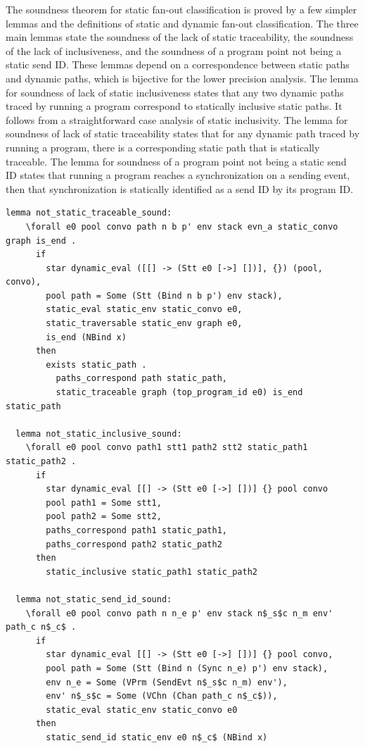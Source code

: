 \documentclass[10pt]{article}
\begin{document}
The soundness theorem for static fan-out classification is proved
by a few simpler lemmas and the
definitions of static and dynamic fan-out classification.  The three main lemmas state the
soundness of the lack of static traceability, the soundness of the lack of inclusiveness, and
the soundness of a program point not being a static send ID. These lemmas depend on a
correspondence between static paths and dynamic paths, which is bijective for the lower
precision analysis. The lemma for soundness of lack of static inclusiveness states that any two
dynamic paths traced by running a program correspond to statically inclusive static paths. It
follows from a straightforward case analysis of static inclusivity. The lemma for soundness of
lack of static traceability states that for any dynamic path traced by running a program, there
is a corresponding static path that is statically traceable. The lemma for soundness of a
program point not being a static send ID states that running a program reaches a
synchronization on a sending event, then that synchronization is statically identified as a
send ID by its program ID.

\begin{lstlisting}[language=logic, mathescape]
  lemma not_static_traceable_sound:
    \forall e0 pool convo path n b p' env stack evn_a static_convo graph is_end .
      if
        star dynamic_eval ([[] -> (Stt e0 [->] [])], {}) (pool, convo), 
        pool path = Some (Stt (Bind n b p') env stack),
        static_eval static_env static_convo e0,
        static_traversable static_env graph e0,
        is_end (NBind x)
      then
        exists static_path . 
          paths_correspond path static_path, 
          static_traceable graph (top_program_id e0) is_end static_path

  lemma not_static_inclusive_sound:
    \forall e0 pool convo path1 stt1 path2 stt2 static_path1 static_path2 . 
      if
        star dynamic_eval [[] -> (Stt e0 [->] [])] {} pool convo
        pool path1 = Some stt1, 
        pool path2 = Some stt2, 
        paths_correspond path1 static_path1, 
        paths_correspond path2 static_path2
      then
        static_inclusive static_path1 static_path2

  lemma not_static_send_id_sound:
    \forall e0 pool convo path n n_e p' env stack n$_s$c n_m env' path_c n$_c$ .
      if
        star dynamic_eval [[] -> (Stt e0 [->] [])] {} pool convo, 
        pool path = Some (Stt (Bind n (Sync n_e) p') env stack), 
        env n_e = Some (VPrm (SendEvt n$_s$c n_m) env'), 
        env' n$_s$c = Some (VChn (Chan path_c n$_c$)), 
        static_eval static_env static_convo e0
      then 
        static_send_id static_env e0 n$_c$ (NBind x)
\end{lstlisting}
\end{document}

